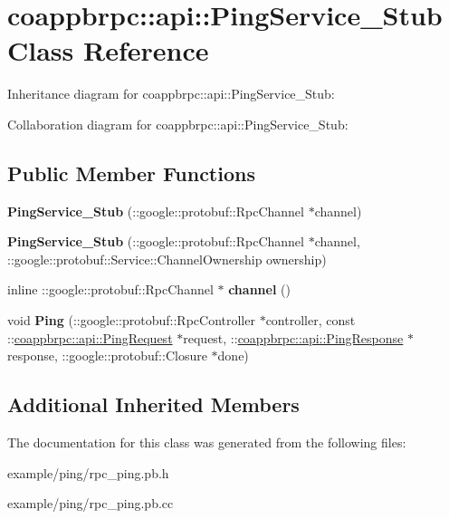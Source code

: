 \hypertarget{classcoappbrpc_1_1api_1_1PingService__Stub}{}\section{coappbrpc\+:\+:api\+:\+:Ping\+Service\+\_\+\+Stub Class Reference}
\label{classcoappbrpc_1_1api_1_1PingService__Stub}


Inheritance diagram for coappbrpc\+:\+:api\+:\+:Ping\+Service\+\_\+\+Stub\+:


Collaboration diagram for coappbrpc\+:\+:api\+:\+:Ping\+Service\+\_\+\+Stub\+:
\subsection*{Public Member Functions}
\begin{DoxyCompactItemize}
\item 
\mbox{\label{classcoappbrpc_1_1api_1_1PingService__Stub_ad5a4e3e33e5e60b0511826626818cb77}} 
{\bfseries Ping\+Service\+\_\+\+Stub} (\+::google\+::protobuf\+::\+Rpc\+Channel $\ast$channel)
\item 
\mbox{\label{classcoappbrpc_1_1api_1_1PingService__Stub_a9b83ab718d0f997184884cf20a7c1e35}} 
{\bfseries Ping\+Service\+\_\+\+Stub} (\+::google\+::protobuf\+::\+Rpc\+Channel $\ast$channel, \+::google\+::protobuf\+::\+Service\+::\+Channel\+Ownership ownership)
\item 
\mbox{\label{classcoappbrpc_1_1api_1_1PingService__Stub_ac7f325559f8962e1735d9afbbfdb61e8}} 
inline \+::google\+::protobuf\+::\+Rpc\+Channel $\ast$ {\bfseries channel} ()
\item 
\mbox{\label{classcoappbrpc_1_1api_1_1PingService__Stub_a0f1f820265a5ef1a99f4ab1addf6e36c}} 
void {\bfseries Ping} (\+::google\+::protobuf\+::\+Rpc\+Controller $\ast$controller, const \+::\hyperlink{classcoappbrpc_1_1api_1_1PingRequest}{coappbrpc\+::api\+::\+Ping\+Request} $\ast$request, \+::\hyperlink{classcoappbrpc_1_1api_1_1PingResponse}{coappbrpc\+::api\+::\+Ping\+Response} $\ast$response, \+::google\+::protobuf\+::\+Closure $\ast$done)
\end{DoxyCompactItemize}
\subsection*{Additional Inherited Members}


The documentation for this class was generated from the following files\+:\begin{DoxyCompactItemize}
\item 
example/ping/rpc\+\_\+ping.\+pb.\+h\item 
example/ping/rpc\+\_\+ping.\+pb.\+cc\end{DoxyCompactItemize}
